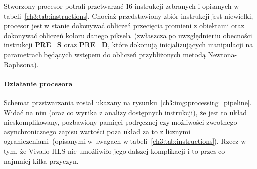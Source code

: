 Stworzony procesor potrafi przetwarzać 16 instrukcji zebranych i opisanych w tabeli~\ref{ch3:tab:instructions}. Chociaż przedstawiony zbiór instrukcji jest niewielki, procesor jest w stanie dokonywać obliczeń przecięcia promieni z obiektami oraz dokonywać obliczeń koloru danego piksela~(zwłaszcza po uwzględnieniu obecności instrukcji \textbf{PRE\_S} oraz \textbf{PRE\_D}, które dokonują inicjalizujących manipulacji na parametrach będących wstępem do obliczeń przybliżonych metodą Newtona-Raphsona). 

\paragraph{Działanie procesora} Schemat przetwarzania został ukazany na rysunku~\ref{ch3:img:processing_pipeline}. 
Widać na nim (oraz co wynika z analizy dostępnych instrukcji), że jest to układ nieskomplikowany, pozbawiony pamięci podręcznej czy możliwości zwrotnego asynchronicznego zapisu wartości poza układ za to z licznymi ograniczeniami~(opisanymi w uwagach w tabeli~\ref{ch3:tab:instructions}). Rzecz w tym, że Vivado HLS nie umożliwiło jego dalszej komplikacji i to przez co najmniej kilka przyczyn. 
